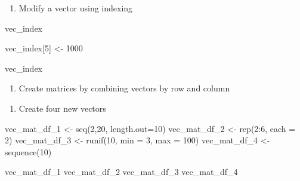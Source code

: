 \documentclass[
  letterpaper,
  DIV=11,
  numbers=noendperiod]{scrreprt}
\newenvironment{Shaded}{}{}
\newcommand{\AttributeTok}[1]{\textcolor[rgb]{0.84,0.23,0.29}{#1}}
\newcommand{\DecValTok}[1]{\textcolor[rgb]{0.00,0.36,0.77}{#1}}
\newcommand{\FunctionTok}[1]{\textcolor[rgb]{0.44,0.26,0.76}{#1}}
\newcommand{\NormalTok}[1]{\textcolor[rgb]{0.14,0.16,0.18}{#1}}
\newcommand{\OtherTok}[1]{\textcolor[rgb]{0.44,0.26,0.76}{#1}}
\newcommand{\SpecialCharTok}[1]{\textcolor[rgb]{0.00,0.36,0.77}{#1}}
\providecommand{\tightlist}{%
  \setlength{\itemsep}{0pt}\setlength{\parskip}{0pt}}\usepackage{longtable,booktabs,array}
\begin{document}
\begin{enumerate}
\def\labelenumi{\alph{enumi})}
\setcounter{enumi}{3}
\tightlist
\item
  Modify a vector using indexing
\end{enumerate}

\begin{Shaded}
\begin{Highlighting}[]
\NormalTok{vec\_index}
\end{Highlighting}
\end{Shaded}

\begin{Shaded}
\begin{Highlighting}[]
\NormalTok{vec\_index[}\DecValTok{5}\NormalTok{] }\OtherTok{\textless{}{-}} \DecValTok{1000}
\end{Highlighting}
\end{Shaded}

\begin{Shaded}
\begin{Highlighting}[]
\NormalTok{vec\_index}
\end{Highlighting}
\end{Shaded}

\begin{enumerate}
\def\labelenumi{\Alph{enumi})}
\setcounter{enumi}{4}
\tightlist
\item
  Create matrices by combining vectors by row and column
\end{enumerate}

\begin{enumerate}
\def\labelenumi{\arabic{enumi}.}
\tightlist
\item
  Create four new vectors
\end{enumerate}

\begin{Shaded}
\begin{Highlighting}[]
\NormalTok{vec\_mat\_df\_1 }\OtherTok{\textless{}{-}} \FunctionTok{seq}\NormalTok{(}\DecValTok{2}\NormalTok{,}\DecValTok{20}\NormalTok{, }\AttributeTok{length.out=}\DecValTok{10}\NormalTok{)}
\NormalTok{vec\_mat\_df\_2 }\OtherTok{\textless{}{-}} \FunctionTok{rep}\NormalTok{(}\DecValTok{2}\SpecialCharTok{:}\DecValTok{6}\NormalTok{, }\AttributeTok{each =} \DecValTok{2}\NormalTok{)}
\NormalTok{vec\_mat\_df\_3 }\OtherTok{\textless{}{-}} \FunctionTok{runif}\NormalTok{(}\DecValTok{10}\NormalTok{, }\AttributeTok{min =} \DecValTok{3}\NormalTok{, }\AttributeTok{max =} \DecValTok{100}\NormalTok{)}
\NormalTok{vec\_mat\_df\_4 }\OtherTok{\textless{}{-}} \FunctionTok{sequence}\NormalTok{(}\DecValTok{10}\NormalTok{)}

\NormalTok{vec\_mat\_df\_1}
\NormalTok{vec\_mat\_df\_2}
\NormalTok{vec\_mat\_df\_3}
\NormalTok{vec\_mat\_df\_4}
\end{Highlighting}
\end{Shaded}
\end{document}
